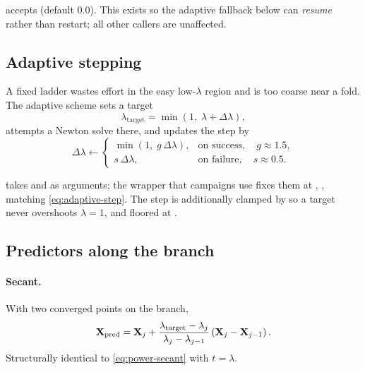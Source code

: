 \begin{implnote}
 accepts  (default $0.0$). This
exists so the adaptive fallback below can \emph{resume} rather than restart; all
other callers are unaffected.
\end{implnote}

\subsection{Adaptive stepping}

A fixed ladder wastes effort in the easy low-$\lambda$ region and is too coarse
near a fold. The adaptive scheme sets a target
\begin{equation}
  \lambda_{\mathrm{target}} = \min(1,\;\lambda + \Delta\lambda),
\end{equation}
attempts a Newton solve there, and updates the step by
\begin{equation}
  \Delta\lambda \leftarrow
  \begin{cases}
    \min(1,\;g\,\Delta\lambda), & \text{on success},\quad g \approx 1.5,\\[2pt]
    s\,\Delta\lambda,           & \text{on failure},\quad s \approx 0.5 .
  \end{cases}
  \label{eq:adaptive-step}
\end{equation}

\begin{implnote}
 takes  and  as
arguments; the wrapper that campaigns use fixes them at
, , matching \eqref{eq:adaptive-step}. The
step is additionally clamped by 
so a target never overshoots $\lambda=1$, and floored at .
\end{implnote}

\subsection{Predictors along the branch}

\paragraph{Secant.} With two converged points on the branch,
\begin{equation}
  \mathbf{X}_{\mathrm{pred}}
  = \mathbf{X}_j
  + \frac{\lambda_{\mathrm{target}}-\lambda_j}{\lambda_j-\lambda_{j-1}}
    \left(\mathbf{X}_j - \mathbf{X}_{j-1}\right).
  \label{eq:lambda-secant}
\end{equation}
Structurally identical to \eqref{eq:power-secant} with $t=\lambda$.


